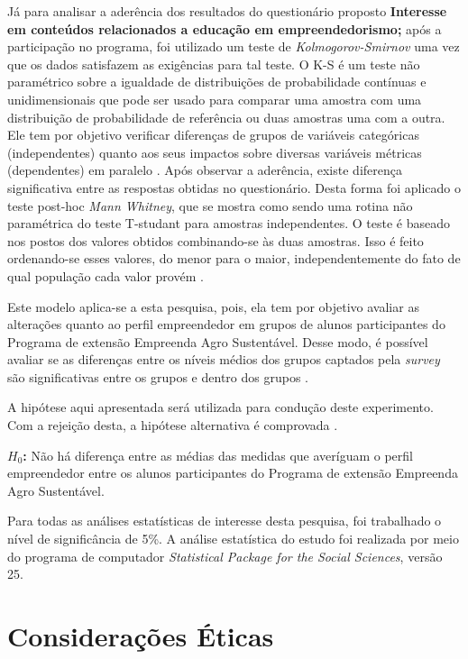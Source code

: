 Já para analisar a aderência dos resultados do questionário proposto \textbf{Interesse em conteúdos relacionados a educação em empreendedorismo;} após a participação no programa, foi utilizado um teste de \textit{Kolmogorov-Smirnov} uma vez que os dados satisfazem as exigências para tal teste. O K-S é um teste não paramétrico sobre a igualdade de distribuições de probabilidade contínuas e unidimensionais que pode ser usado para comparar uma amostra com uma distribuição de probabilidade de referência ou duas amostras uma com a outra. Ele tem por objetivo verificar diferenças de grupos de variáveis categóricas (independentes) quanto aos seus impactos sobre diversas variáveis métricas (dependentes) em paralelo \cite{hair_alise_2009}. Após observar a aderência, existe diferença significativa entre as respostas obtidas no questionário. Desta forma foi aplicado o teste post-hoc \textit{Mann Whitney}, que se mostra como sendo uma rotina não paramétrica do teste T-studant para amostras independentes. O teste é baseado nos postos dos valores obtidos combinando-se às duas amostras. Isso é feito ordenando-se esses valores, do menor para o maior, independentemente do fato de qual população cada valor provém \cite{matsouaka_optimal_2018}.

Este modelo aplica-se a esta pesquisa, pois, ela tem por objetivo avaliar as alterações quanto ao perfil empreendedor em grupos de alunos participantes do Programa de extensão Empreenda Agro Sustentável. Desse modo, é possível avaliar se as diferenças entre os níveis médios dos grupos captados pela \textit{survey} são significativas entre os grupos e dentro dos grupos \cite{rocha_avaliacao_2014}.

A hipótese aqui apresentada será utilizada para condução deste experimento. Com a rejeição desta, a hipótese alternativa é comprovada \cite{hair_alise_2009}.

\textbf{$H_0$:} Não há diferença entre as médias das medidas que averíguam o perfil empreendedor entre os alunos participantes do Programa de extensão Empreenda Agro Sustentável.

Para todas as análises estatísticas de interesse desta pesquisa, foi trabalhado o nível de significância de 5\%. A análise estatística do estudo foi realizada por meio do programa de computador \textit{Statistical Package for the Social Sciences}, \cite{ibm_corp_ibm_2017} versão 25. 

\section{Considerações Éticas}

